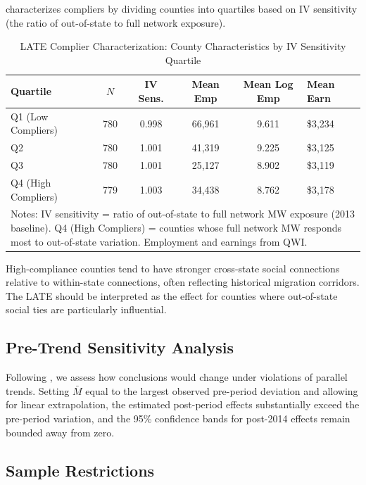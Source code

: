 \documentclass[12pt]{article}
\begin{document}
 characterizes compliers by dividing counties into quartiles based on IV sensitivity (the ratio of out-of-state to full network exposure).

\begin{table}[!ht]
\centering
\caption{\label{tab:compliers}LATE Complier Characterization: County Characteristics by IV Sensitivity Quartile}
\centering
\small
\begin{tabular}[t]{lccccl}
\toprule
Quartile & $N$ & IV Sens. & Mean Emp & Mean Log Emp & Mean Earn \\
\midrule
Q1 (Low Compliers) & 780 & 0.998 & 66,961 & 9.611 & \$3,234 \\
Q2 & 780 & 1.001 & 41,319 & 9.225 & \$3,125 \\
Q3 & 780 & 1.001 & 25,127 & 8.902 & \$3,119 \\
Q4 (High Compliers) & 779 & 1.003 & 34,438 & 8.762 & \$3,178 \\
\bottomrule
\multicolumn{6}{p{0.95\linewidth}}{\footnotesize Notes: IV sensitivity = ratio of out-of-state to full network MW exposure (2013 baseline). Q4 (High Compliers) = counties whose full network MW responds most to out-of-state variation. Employment and earnings from QWI.}\\
\end{tabular}
\end{table}

High-compliance counties tend to have stronger cross-state social connections relative to within-state connections, often reflecting historical migration corridors. The LATE should be interpreted as the effect for counties where out-of-state social ties are particularly influential.

\subsection{Pre-Trend Sensitivity Analysis}

Following \citet{rambachanroth2023credible}, we assess how conclusions would change under violations of parallel trends. Setting $\bar{M}$ equal to the largest observed pre-period deviation and allowing for linear extrapolation, the estimated post-period effects substantially exceed the pre-period variation, and the 95\% confidence bands for post-2014 effects remain bounded away from zero.

\subsection{Sample Restrictions}
\end{document}
